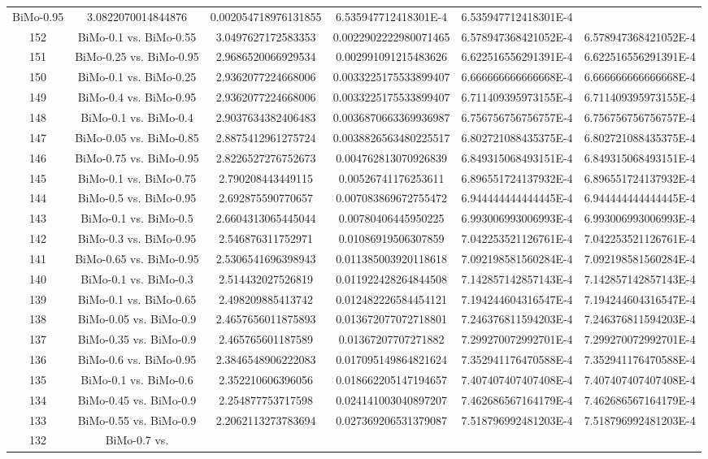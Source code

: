 \documentclass[a4paper,10pt]{article}
\begin{document}
\begin{landscape}
\begin{table}[!htp]
\begin{tabular}{cccccc}
BiMo-0.95&3.0822070014844876&0.002054718976131855&6.535947712418301E-4&6.535947712418301E-4\\152&BiMo-0.1 vs. BiMo-0.55&3.0497627172583353&0.0022902222980071465&6.578947368421052E-4&6.578947368421052E-4\\151&BiMo-0.25 vs. BiMo-0.95&2.9686520066929534&0.002991091215483626&6.622516556291391E-4&6.622516556291391E-4\\150&BiMo-0.1 vs. BiMo-0.25&2.9362077224668006&0.0033225175533899407&6.666666666666668E-4&6.666666666666668E-4\\149&BiMo-0.4 vs. BiMo-0.95&2.9362077224668006&0.0033225175533899407&6.711409395973155E-4&6.711409395973155E-4\\148&BiMo-0.1 vs. BiMo-0.4&2.9037634382406483&0.0036870663369936987&6.756756756756757E-4&6.756756756756757E-4\\147&BiMo-0.05 vs. BiMo-0.85&2.8875412961275724&0.0038826563480225517&6.802721088435375E-4&6.802721088435375E-4\\146&BiMo-0.75 vs. BiMo-0.95&2.8226527276752673&0.004762813070926839&6.849315068493151E-4&6.849315068493151E-4\\145&BiMo-0.1 vs. BiMo-0.75&2.790208443449115&0.00526741176253611&6.896551724137932E-4&6.896551724137932E-4\\144&BiMo-0.5 vs. BiMo-0.95&2.692875590770657&0.007083869672755472&6.944444444444445E-4&6.944444444444445E-4\\143&BiMo-0.1 vs. BiMo-0.5&2.6604313065445044&0.00780406445950225&6.993006993006993E-4&6.993006993006993E-4\\142&BiMo-0.3 vs. BiMo-0.95&2.546876311752971&0.01086919506307859&7.042253521126761E-4&7.042253521126761E-4\\141&BiMo-0.65 vs. BiMo-0.95&2.5306541696398943&0.011385003920118618&7.092198581560284E-4&7.092198581560284E-4\\140&BiMo-0.1 vs. BiMo-0.3&2.514432027526819&0.011922428264844508&7.142857142857143E-4&7.142857142857143E-4\\139&BiMo-0.1 vs. BiMo-0.65&2.498209885413742&0.012482226584454121&7.194244604316547E-4&7.194244604316547E-4\\138&BiMo-0.05 vs. BiMo-0.9&2.4657656011875893&0.013672077072718801&7.246376811594203E-4&7.246376811594203E-4\\137&BiMo-0.35 vs. BiMo-0.9&2.465765601187589&0.01367207707271882&7.299270072992701E-4&7.299270072992701E-4\\136&BiMo-0.6 vs. BiMo-0.95&2.3846548906222083&0.017095149864821624&7.352941176470588E-4&7.352941176470588E-4\\135&BiMo-0.1 vs. BiMo-0.6&2.352210606396056&0.018662205147194657&7.407407407407408E-4&7.407407407407408E-4\\134&BiMo-0.45 vs. BiMo-0.9&2.254877753717598&0.024141003040897207&7.462686567164179E-4&7.462686567164179E-4\\133&BiMo-0.55 vs. BiMo-0.9&2.2062113273783694&0.027369206531379087&7.518796992481203E-4&7.518796992481203E-4\\132&BiMo-0.7 vs. 
\end{tabular}
\end{table}
\end{landscape}
\end{document}

